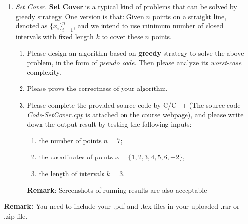 \documentclass[12pt,a4paper]{article}
\makeatletter
\newtheorem*{solution}{Solution}
\theoremstyle{definition}
\renewenvironment{solution}[1][Solution] {\par\pushQED{\qed}\normalfont\topsep6\p@\@plus6\p@\relax\trivlist\item[\hskip\labelsep\bfseries#1\@addpunct{.}]\ignorespaces}{\popQED\endtrivlist\@endpefalse} \makeatother
\makeatother
\begin{document}
\begin{enumerate}
    \item \textit{Set Cover.} \textbf{Set Cover} is a typical kind of problems that can be solved by greedy strategy. One version is that: Given $n$ points on a straight line, denoted as $\{x_i\}_{i=1}^n$, and we intend to use minimum number of closed intervals with fixed length $k$ to cover these $n$ points.
    \begin{enumerate}
    	\item Please design an algorithm based on \textbf{greedy} strategy to solve the above problem, in the form of \emph{pseudo code}. Then please analyze its \emph{worst-case} complexity.
    	\item Please prove the correctness of your algorithm.
    	\item Please complete the provided source code by C/C++ {\color{blue}(The source code \emph{Code-SetCover.cpp} is attached on the course webpage)}, and please write down the output result by testing the following inputs: 
    	\begin{enumerate}
    		\item the number of points $n=7$;
    		\item the coordinates of points
    		$x=\{1,2,3,4,5,6,-2\}$;
    		\item the length of intervals
    		$k=3$.
    	\end{enumerate}
        \textbf{Remark}: Screenshots of running results are also acceptable 
    \end{enumerate}

\end{enumerate}



\vspace{20pt}

\textbf{Remark:} You need to include your .pdf and .tex files in your uploaded .rar or .zip file.

\end{document}

